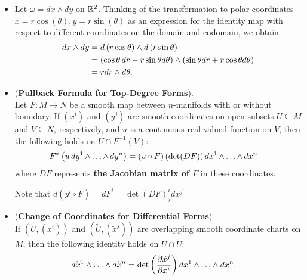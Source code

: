 \documentclass[11pt]{article}
\begin{document}
\begin{itemize}
\item \begin{example}
Let $\omega =  dx \wedge dy$ on ${\mathbb R}^2$. Thinking of the transformation to polar coordinates $x = r\cos(\theta), y = r\sin(\theta)$ as an expression for the identity map with
respect to different coordinates on the domain and codomain, we obtain
\begin{align*}
dx \wedge dy &= d\left(r \cos\theta\right) \wedge d\left(r \sin\theta\right)\\
&= (\cos \theta \,dr -r \sin \theta  d\theta) \wedge (\sin \theta dr + r\cos \theta d\theta) \\
&= r dr \wedge d\theta.
\end{align*}
\end{example}

\item \begin{proposition}(\textbf{Pullback Formula for Top-Degree Forms}). \\
Let $F: M \rightarrow N$ be a smooth map between $n$-manifolds with or without boundary. If $(x^i)$ and $(y^j)$ are smooth coordinates on open subsets $U \subseteq M$ and $V \subseteq N$, respectively, and $u$ is a continuous real-valued function on $V$, then the following holds on $U \cap F^{-1}(V)$:
\begin{align}
F^{*}\left(u\,dy^{1} \,{\wedge}\ldots{\wedge}\, dy^{n}\right) &= (u \circ F)\,(\det(DF))\,dx^{1} \,{\wedge}\ldots{\wedge}\, dx^{n}  \label{eqn: differential_form_pull_back_coordinate_1}
\end{align}
where $DF$ represents \textbf{the Jacobian matrix of $F$} in these coordinates.
\end{proposition} Note that $d(y^i \circ F) = dF^{i} = \det(DF)_{j}^{i} dx^{j}$

\item \begin{corollary} (\textbf{Change of Coordinates for Differential Forms})\\
If $(U, (x^i))$ and $(\widetilde{U}, (\widetilde{x}^j))$ are overlapping smooth coordinate charts on $M$, then the following identity holds on $U \cap \widetilde{U}$:
\begin{align}
d\widetilde{x}^{1} \wedge \ldots \wedge d\widetilde{x}^{n} &=\det\left(\dfrac{\partial \widetilde{x}^{j}}{\partial x^i}\right) dx^1 \wedge \ldots \wedge dx^n.  \label{eqn: differential_form_change_of_variables}
\end{align}
\end{corollary}


\end{itemize}
\end{document}
